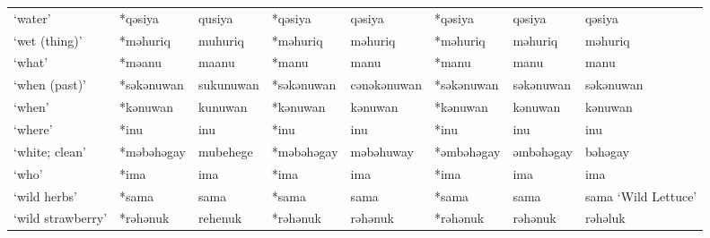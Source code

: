 \begin{landscape}
\begin{longtable}[c]{@{}p{3cm}<{\raggedright}p{2.75cm}<{\raggedright}p{2.75cm}<{\raggedright}p{2.75cm}<{\raggedright}p{2.75cm}<{\raggedright}p{2.75cm}<{\raggedright}p{2.75cm}<{\raggedright}p{2.75cm}<{\raggedright}@{}}
`water'                                              & *qəsiya      & qusiya                        & *qəsiya        & qəsiya                     & *qəsiya          & qəsiya                   & qəsiya                            \\
`wet (thing)'                                        & *məhuriq     & muhuriq                       & *məhuriq       & məhuriq                    & *məhuriq         & məhuriq                  & məhuriq                           \\
`what'                                               & *məanu       & maanu                         & *manu          & manu                       & *manu            & manu                     & manu                              \\
`when (past)'                                        & *səkənuwan   & sukunuwan                     & *səkənuwan     & cənəkənuwan                & *səkənuwan       & səkənuwan                & səkənuwan                         \\
`when'                                               & *kənuwan     & kunuwan                       & *kənuwan       & kənuwan                    & *kənuwan         & kənuwan                  & kənuwan                           \\
`where'                                              & *inu         & inu                           & *inu           & inu                        & *inu             & inu                      & inu                               \\
`white; clean'                                       & *məbəhəgay   & mubehege                      & *məbəhəgay     & məbəhuway                  & *əmbəhəgay       & əmbəhəgay                & bəhəgay                           \\
`who'                                                & *ima         & ima                           & *ima           & ima                        & *ima             & ima                      & ima                               \\
`wild herbs'                                         & *sama        & sama                          & *sama          & sama                       & *sama            & sama                     & sama `Wild Lettuce'               \\
`wild strawberry'                                    & *rəhənuk     & rehenuk                       & *rəhənuk       & rəhənuk                    & *rəhənuk         & rəhənuk                  & rəhəluk                           \\

\end{longtable}
\end{landscape}
